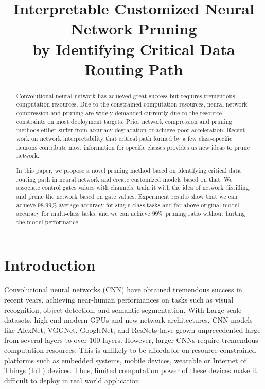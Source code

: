\documentclass[conference]{IEEEtran}
\begin{document}
\title{Interpretable Customized Neural Network Pruning\\
by Identifying Critical Data Routing Path}

\author{
\and
{}
}

\maketitle

\begin{abstract}
Convolutional neural network has achieved great success but requires tremendous computation resources. Due to the constrained computation resources, neural network compression and pruning are widely demanded currently due to the resource constraints on most deployment targets. Prior network compression and pruning methods either suffer from accuracy degradation or achieve poor acceleration. Recent work on network interpretability that critical path formed by a few class-specific neurons contribute most information for specific classes provides us new ideas to prune network. 

In this paper, we propose a novel pruning method based on identifying critical data routing path in neural network and create customized models based on that. We associate control gates values with channels, train it with the idea of network distilling, and prune the network based on gate values. Experiment results show that we can achieve $98.99\%$ average accuracy for single class tasks and far above original model accuracy for multi-class tasks, and we can achieve $99\%$ pruning ratio without hurting the model performance.
\end{abstract}

\section{Introduction}

Convolutional neural networks (CNN) have obtained tremendous success in recent years, achieving near-human performances on tasks such as visual recognition\cite{krizhevsky2012imagenet}, object
detection\cite{girshick2014rich}, and semantic segmentation\cite{long2015fully}. With Large-scale
datasets, high-end modern GPUs and new network architectures, CNN models like AlexNet\cite{krizhevsky2012imagenet}, VGGNet\cite{simonyan2014very}, GoogleNet\cite{szegedy2015going}, and ResNets\cite{he2016deep} have grown unprecedented large from several layers to over $100$ layers. However, larger CNNs require tremendous computation resources\cite{he2016deep}. This is unlikely to be affordable on resource-constrained platforms such as embedded systems, mobile devices, wearable or Internet of Things (IoT) devices. Thus, limited computation power of these devices make it difficult to deploy in real world application.
\end{document}
